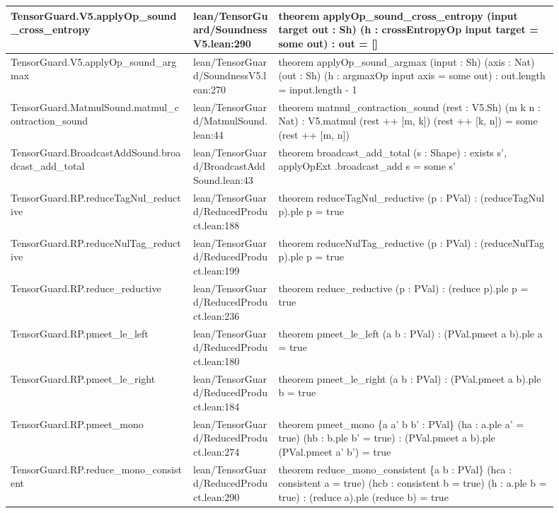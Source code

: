 \documentclass[10pt]{article}
\begin{document}
\begin{longtable}{|p{0.30\linewidth}|p{0.14\linewidth}|p{0.46\linewidth}|}
\hline
TensorGuard.V5.applyOp\_sound\_cross\_entropy & lean/TensorGuard/SoundnessV5.lean:290 & theorem applyOp\_sound\_cross\_entropy (input target out : Sh) (h : crossEntropyOp input target = some out) : out = [] \\
\hline
TensorGuard.V5.applyOp\_sound\_argmax & lean/TensorGuard/SoundnessV5.lean:270 & theorem applyOp\_sound\_argmax (input : Sh) (axis : Nat) (out : Sh) (h : argmaxOp input axis = some out) : out.length = input.length - 1 \\
\hline
TensorGuard.MatmulSound.matmul\_contraction\_sound & lean/TensorGuard/MatmulSound.lean:44 & theorem matmul\_contraction\_sound (rest : V5.Sh) (m k n : Nat) : V5.matmul (rest ++ [m, k]) (rest ++ [k, n]) = some (rest ++ [m, n]) \\
\hline
TensorGuard.BroadcastAddSound.broadcast\_add\_total & lean/TensorGuard/BroadcastAddSound.lean:43 & theorem broadcast\_add\_total (s : Shape) : exists s', applyOpExt .broadcast\_add s = some s' \\
\hline
TensorGuard.RP.reduceTagNul\_reductive & lean/TensorGuard/ReducedProduct.lean:188 & theorem reduceTagNul\_reductive (p : PVal) : (reduceTagNul p).ple p = true \\
\hline
TensorGuard.RP.reduceNulTag\_reductive & lean/TensorGuard/ReducedProduct.lean:199 & theorem reduceNulTag\_reductive (p : PVal) : (reduceNulTag p).ple p = true \\
\hline
TensorGuard.RP.reduce\_reductive & lean/TensorGuard/ReducedProduct.lean:236 & theorem reduce\_reductive (p : PVal) : (reduce p).ple p = true \\
\hline
TensorGuard.RP.pmeet\_le\_left & lean/TensorGuard/ReducedProduct.lean:180 & theorem pmeet\_le\_left (a b : PVal) : (PVal.pmeet a b).ple a = true \\
\hline
TensorGuard.RP.pmeet\_le\_right & lean/TensorGuard/ReducedProduct.lean:184 & theorem pmeet\_le\_right (a b : PVal) : (PVal.pmeet a b).ple b = true \\
\hline
TensorGuard.RP.pmeet\_mono & lean/TensorGuard/ReducedProduct.lean:274 & theorem pmeet\_mono \{a a' b b' : PVal\} (ha : a.ple a' = true) (hb : b.ple b' = true) : (PVal.pmeet a b).ple (PVal.pmeet a' b') = true \\
\hline
TensorGuard.RP.reduce\_mono\_consistent & lean/TensorGuard/ReducedProduct.lean:290 & theorem reduce\_mono\_consistent \{a b : PVal\} (hca : consistent a = true) (hcb : consistent b = true) (h : a.ple b = true) : (reduce a).ple (reduce b) = true \\
\hline

\end{longtable}
\end{document}
